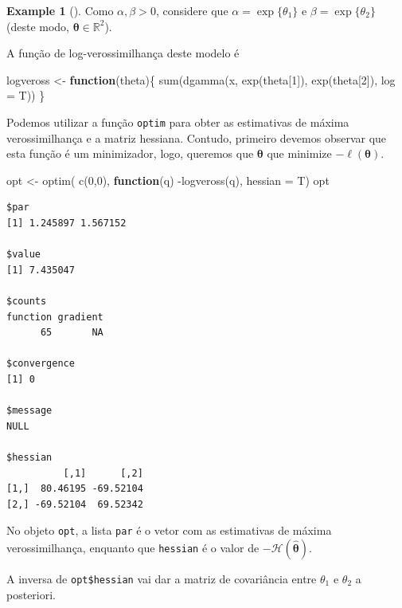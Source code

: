 \documentclass[
  letterpaper,
  DIV=11,
  numbers=noendperiod]{scrreprt}
\newenvironment{Shaded}{\begin{snugshade}}{\end{snugshade}}
\newcommand{\AttributeTok}[1]{\textcolor[rgb]{0.40,0.45,0.13}{#1}}
\newcommand{\ControlFlowTok}[1]{\textcolor[rgb]{0.00,0.23,0.31}{\textbf{#1}}}
\newcommand{\DecValTok}[1]{\textcolor[rgb]{0.68,0.00,0.00}{#1}}
\newcommand{\FunctionTok}[1]{\textcolor[rgb]{0.28,0.35,0.67}{#1}}
\newcommand{\NormalTok}[1]{\textcolor[rgb]{0.00,0.23,0.31}{#1}}
\newcommand{\OtherTok}[1]{\textcolor[rgb]{0.00,0.23,0.31}{#1}}
\newcommand{\SpecialCharTok}[1]{\textcolor[rgb]{0.37,0.37,0.37}{#1}}
\theoremstyle{definition}
\theoremstyle{plain}
\theoremstyle{definition}
\newtheorem{example}{Example}[chapter]
\theoremstyle{remark}
\begin{document}
\begin{example}[]
Como \(\alpha,\beta>0\), considere que \(\alpha=\exp\{\theta_1\}\) e
\(\beta=\exp\{\theta_2\}\) (deste modo,
\(\boldsymbol{\theta}\in\mathbb{R}^2\)).

A função de log-verossimilhança deste modelo é

\begin{Shaded}
\begin{Highlighting}[]
\NormalTok{logveross }\OtherTok{\textless{}{-}} \ControlFlowTok{function}\NormalTok{(theta)\{ }\FunctionTok{sum}\NormalTok{(}\FunctionTok{dgamma}\NormalTok{(x, }\FunctionTok{exp}\NormalTok{(theta[}\DecValTok{1}\NormalTok{]), }\FunctionTok{exp}\NormalTok{(theta[}\DecValTok{2}\NormalTok{]), }\AttributeTok{log =}\NormalTok{ T))}
\NormalTok{\}}
\end{Highlighting}
\end{Shaded}

Podemos utilizar a função \texttt{optim} para obter as estimativas de
máxima verossimilhança e a matriz hessiana. Contudo, primeiro devemos
observar que esta função é um minimizador, logo, queremos que
\(\boldsymbol{\theta}\) que minimize \(-\ell({\boldsymbol{\theta}})\).

\begin{Shaded}
\begin{Highlighting}[]
\NormalTok{opt }\OtherTok{\textless{}{-}} \FunctionTok{optim}\NormalTok{( }\FunctionTok{c}\NormalTok{(}\DecValTok{0}\NormalTok{,}\DecValTok{0}\NormalTok{), }\ControlFlowTok{function}\NormalTok{(q) }\SpecialCharTok{{-}}\FunctionTok{logveross}\NormalTok{(q), }\AttributeTok{hessian =}\NormalTok{ T)}
\NormalTok{opt}
\end{Highlighting}
\end{Shaded}

\begin{verbatim}
$par
[1] 1.245897 1.567152

$value
[1] 7.435047

$counts
function gradient 
      65       NA 

$convergence
[1] 0

$message
NULL

$hessian
          [,1]      [,2]
[1,]  80.46195 -69.52104
[2,] -69.52104  69.52342
\end{verbatim}

No objeto \texttt{opt}, a lista \texttt{par} é o vetor com as
estimativas de máxima verossimilhança, enquanto que \texttt{hessian} é o
valor de \(-\mathcal{H}(\hat{\boldsymbol{\theta}})\).

A inversa de \texttt{opt\$hessian} vai dar a matriz de covariância entre
\(\theta_1\) e \(\theta_2\) a posteriori.


\end{example}
\end{document}
